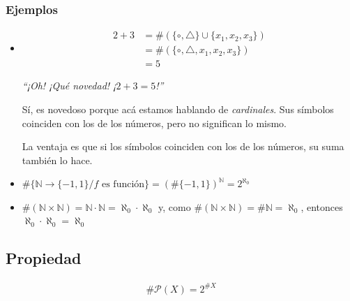 \subsubsection{Ejemplos}
\begin{itemize}
\item \begin{align*}
    2 + 3 &= 
    \# \left(\{\circ, \bigtriangleup\} \cup \{x_1,x_2,x_3\}\right) \\
    & = \# \left(\{\circ, \bigtriangleup, x_1,x_2,x_3\}\right) \\
    &= 5
\end{align*}

\textit{``¡Oh! ¡Qué novedad! ¡$2+3=5$!''} 

Sí, es novedoso porque acá estamos hablando de \textit{cardinales}.
Sus símbolos coinciden con los de los números, pero no significan lo
mismo.

La ventaja es que si los símbolos coinciden con los de los números,
su suma también lo hace.

\item $\# \{ \mathbb{N} \to \{-1,1\} / f \text{ es función} \} 
    = {(\#\{-1,1\})}^{\mathbb{N}} = 2^{\aleph_0}$

    \item $\# (\mathbb{N}\times\mathbb{N}) =  \mathbb{N} \cdot \mathbb{N} 
        = \aleph_0 \cdot \aleph_0$ y, como 
        $\# (\mathbb{N} \times \mathbb{N}) = \# \mathbb{N} = \aleph_0 $, entonces 
        $\aleph_0 \cdot \aleph_0 = \aleph_0$
\end{itemize}

\subsection{Propiedad}
\begin{gather*}
    \# \mathcal{P}(X) = 2^{\# X}
\end{gather*}

